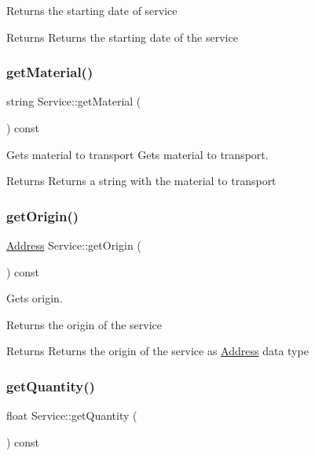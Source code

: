 Returns the starting date of service

\begin{DoxyReturn}{Returns}
Returns the starting date of the service 
\end{DoxyReturn}
\mbox{\label{class_service_a92be216e9c710b28bc4046353884b3e2}} 
\subsubsection{\texorpdfstring{get\+Material()}{getMaterial()}}
{\footnotesize\ttfamily string Service\+::get\+Material (\begin{DoxyParamCaption}{ }\end{DoxyParamCaption}) const}



Gets material to transport Gets material to transport. 

\begin{DoxyReturn}{Returns}
Returns a string with the material to transport 
\end{DoxyReturn}
\mbox{\label{class_service_a186e0115cc0197181b4e060bfe4cd502}} 
\subsubsection{\texorpdfstring{get\+Origin()}{getOrigin()}}
{\footnotesize\ttfamily \hyperlink{class_address}{Address} Service\+::get\+Origin (\begin{DoxyParamCaption}{ }\end{DoxyParamCaption}) const}



Gets origin. 

Returns the origin of the service

\begin{DoxyReturn}{Returns}
Returns the origin of the service as \hyperlink{class_address}{Address} data type 
\end{DoxyReturn}
\mbox{\label{class_service_aceff76eb1aba00c9c74eb98d56771a6a}} 
\subsubsection{\texorpdfstring{get\+Quantity()}{getQuantity()}}
{\footnotesize\ttfamily float Service\+::get\+Quantity (\begin{DoxyParamCaption}{ }\end{DoxyParamCaption}) const}



